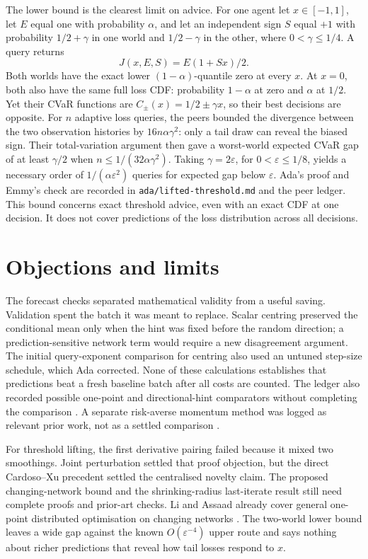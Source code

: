 \documentclass{article}
\begin{document}
The lower bound is the clearest limit on advice. For one agent let \(x\in[-1,1]\), let \(E\) equal one with
probability \(\alpha\), and let an independent sign \(S\) equal \(+1\) with probability \(1/2+\gamma\) in one
world and \(1/2-\gamma\) in the other, where \(0<\gamma\le1/4\). A query returns
\[
J(x,E,S)=E(1+Sx)/2.
\]
Both worlds have the exact lower \((1-\alpha)\)-quantile zero at every \(x\). At \(x=0\), both also have the
same full loss CDF: probability \(1-\alpha\) at zero and \(\alpha\) at \(1/2\). Yet their CVaR functions are
\(C_\pm(x)=1/2\pm\gamma x\), so their best decisions are opposite. For \(n\) adaptive loss queries, the peers
bounded the divergence between the two observation histories by \(16n\alpha\gamma^2\): only a tail draw can
reveal the biased sign. Their total-variation argument then gave a worst-world expected CVaR gap of at least
\(\gamma/2\) when \(n\le1/(32\alpha\gamma^2)\). Taking \(\gamma=2\varepsilon\), for \(0<\varepsilon\le1/8\),
yields a necessary order of \(1/(\alpha\varepsilon^2)\) queries for expected gap below \(\varepsilon\). Ada's
proof and Emmy's check are recorded in \texttt{ada/lifted-threshold.md} and the peer ledger. This bound
concerns exact threshold advice, even with an exact CDF at one decision. It does not cover predictions of the
loss distribution across all decisions.

\section{Objections and limits}

The forecast checks separated mathematical validity from a useful saving. Validation spent the batch it was
meant to replace. Scalar centring preserved the conditional mean only when the hint was fixed before the
random direction; a prediction-sensitive network term would require a new disagreement argument. The initial
query-exponent comparison for centring also used an untuned step-size schedule, which Ada corrected. None of
these calculations establishes that predictions beat a fresh baseline batch after all costs are counted. The
ledger also recorded possible one-point and directional-hint comparators without completing the comparison
\cite{Residual2010,DirectionalHint2026}. A separate risk-averse momentum method was logged as relevant prior
work, not as a settled comparison \cite{Wang2022Momentum}.

For threshold lifting, the first derivative pairing failed because it mixed two smoothings. Joint perturbation
settled that proof objection, but the direct Cardoso--Xu precedent settled the centralised novelty claim. The
proposed changing-network bound and the shrinking-radius last-iterate result still need complete proofs and
prior-art checks. Li and Assaad already cover general one-point distributed optimisation on changing networks
\cite{LiAssaad2021}. The two-world lower bound leaves a wide gap against the known \(O(\varepsilon^{-4})\)
upper route and says nothing about richer predictions that reveal how tail losses respond to \(x\).
\end{document}
